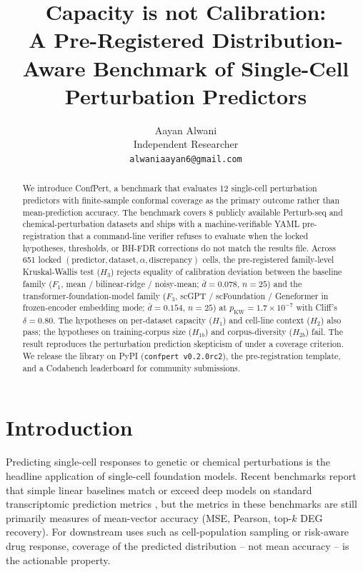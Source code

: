 \documentclass[11pt]{article}
\title{Capacity is not Calibration:\\
A Pre-Registered Distribution-Aware Benchmark of Single-Cell Perturbation Predictors}
\author{
  Aayan Alwani \\
  Independent Researcher \\
  \texttt{alwaniaayan6@gmail.com}
}
\begin{document}
\maketitle

\begin{abstract}
We introduce ConfPert, a benchmark that evaluates 12 single-cell
perturbation predictors with finite-sample conformal coverage as the
primary outcome rather than mean-prediction accuracy. The benchmark
covers 8 publicly available Perturb-seq and chemical-perturbation
datasets and ships with a machine-verifiable YAML pre-registration that
a command-line verifier refuses to evaluate when the locked
hypotheses, thresholds, or BH-FDR corrections do not match the results
file. Across 651 locked $(\text{predictor}, \text{dataset}, \alpha,
\text{discrepancy})$ cells, the pre-registered family-level
Kruskal-Wallis test ($H_3$) rejects equality of calibration deviation
between the baseline family ($F_1$, mean / bilinear-ridge / noisy-mean;
$\bar d = 0.078$, $n = 25$) and the transformer-foundation-model family
($F_3$, scGPT / scFoundation / Geneformer in frozen-encoder embedding
mode; $\bar d = 0.154$, $n = 25$) at
$p_\text{KW} = 1.7 \times 10^{-7}$ with Cliff's $\delta = 0.80$. The
hypotheses on per-dataset capacity ($H_1$) and cell-line context ($H_2$)
also pass; the hypotheses on training-corpus size ($H_{1b}$) and
corpus-diversity ($H_{2b}$) fail. The result reproduces the perturbation
prediction skepticism of \cite{ahlmann2025deep,csendes2025train} under a
coverage criterion. We release the library on PyPI
(\texttt{confpert v0.2.0rc2}), the pre-registration template, and a
Codabench leaderboard for community submissions.
\end{abstract}

\section{Introduction}

Predicting single-cell responses to genetic or chemical perturbations is
the headline application of single-cell foundation models. Recent
benchmarks report that simple linear baselines match or exceed deep
models on standard transcriptomic prediction metrics
\cite{ahlmann2025deep,csendes2025train,kedzierska2025zeroshot}, but the
metrics in these benchmarks are still primarily measures of mean-vector
accuracy (MSE, Pearson, top-$k$ DEG recovery). For downstream uses such
as cell-population sampling or risk-aware drug response, coverage of the
predicted distribution -- not mean accuracy -- is the actionable
property.
\end{document}
